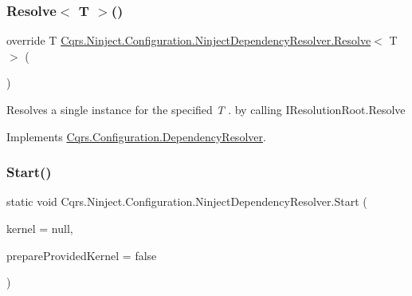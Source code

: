 \subsubsection{\texorpdfstring{Resolve$<$ T $>$()}{Resolve< T >()}}
{\footnotesize\ttfamily override T \hyperlink{classCqrs_1_1Ninject_1_1Configuration_1_1NinjectDependencyResolver_ab9da7f1556cc1ef205d03d3ff62017c0_ab9da7f1556cc1ef205d03d3ff62017c0}{Cqrs.\+Ninject.\+Configuration.\+Ninject\+Dependency\+Resolver.\+Resolve}$<$ T $>$ (\begin{DoxyParamCaption}{ }\end{DoxyParamCaption})\hspace{0.3cm}{\ttfamily [virtual]}}



Resolves a single instance for the specified {\itshape T} . by calling I\+Resolution\+Root.\+Resolve 



Implements \hyperlink{classCqrs_1_1Configuration_1_1DependencyResolver_a1eb177fc6c914b45d138642fb6d9454d_a1eb177fc6c914b45d138642fb6d9454d}{Cqrs.\+Configuration.\+Dependency\+Resolver}.

\mbox{\label{classCqrs_1_1Ninject_1_1Configuration_1_1NinjectDependencyResolver_adc6171ed45679dcbaa67782770ba5083_adc6171ed45679dcbaa67782770ba5083}} 
\subsubsection{\texorpdfstring{Start()}{Start()}}
{\footnotesize\ttfamily static void Cqrs.\+Ninject.\+Configuration.\+Ninject\+Dependency\+Resolver.\+Start (\begin{DoxyParamCaption}\item[{I\+Kernel}]{kernel = {\ttfamily null},  }\item[{bool}]{prepare\+Provided\+Kernel = {\ttfamily false} }\end{DoxyParamCaption})\hspace{0.3cm}{\ttfamily [static]}}



